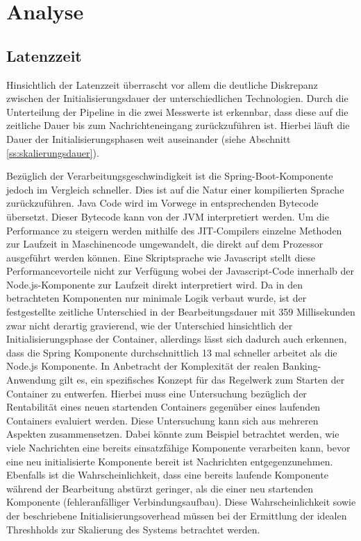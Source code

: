 \section{Analyse}


\subsection{Latenzzeit}
Hinsichtlich der Latenzzeit überrascht vor allem die deutliche Diskrepanz zwischen der Initialisierungsdauer der unterschiedlichen Technologien. Durch die Unterteilung der Pipeline in die zwei Messwerte ist erkennbar, dass diese auf die zeitliche Dauer bis zum Nachrichteneingang zurückzuführen ist. Hierbei läuft die Dauer der Initialisierungsphasen weit auseinander (siehe Abschnitt \ref{ss:skalierungsdauer}).

Bezüglich der Verarbeitungsgeschwindigkeit ist die Spring-Boot-Komponente jedoch im Vergleich schneller. Dies ist auf die Natur einer kompilierten Sprache zurückzuführen. Java Code wird im Vorwege in entsprechenden Bytecode übersetzt. Dieser Bytecode kann von der JVM interpretiert werden. Um die Performance zu steigern werden mithilfe des JIT-Compilers einzelne Methoden zur Laufzeit in Maschinencode umgewandelt, die direkt auf dem Prozessor ausgeführt werden können. Eine Skriptsprache wie Javascript stellt diese Performancevorteile nicht zur Verfügung wobei der Javascript-Code innerhalb der Node.js-Komponente zur Laufzeit direkt interpretiert wird. Da in den betrachteten Komponenten nur minimale Logik verbaut wurde, ist der festgestellte zeitliche Unterschied in der Bearbeitungsdauer mit 359  Millisekunden zwar nicht derartig gravierend, wie der Unterschied hinsichtlich der Initialisierungsphase der Container, allerdings lässt sich dadurch auch erkennen, dass die Spring Komponente durchschnittlich 13 mal schneller arbeitet als die Node.js Komponente. In Anbetracht der Komplexität der realen Banking-Anwendung gilt es, ein spezifisches Konzept für das Regelwerk zum Starten der Container zu entwerfen. Hierbei muss eine Untersuchung bezüglich der Rentabilität eines neuen startenden Containers gegenüber eines laufenden Containers evaluiert werden. Diese Untersuchung kann sich aus mehreren Aspekten zusammensetzen. Dabei könnte zum Beispiel betrachtet werden, wie viele Nachrichten eine bereits einsatzfähige Komponente verarbeiten kann, bevor eine neu initialisierte Komponente bereit ist Nachrichten entgegenzunehmen. Ebenfalls ist die Wahrscheinlichkeit, dass eine bereits laufende Komponente während der Bearbeitung abstürzt geringer, als die einer neu startenden Komponente (fehleranfälliger Verbindungsaufbau). Diese Wahrscheinlichkeit sowie der beschriebene Initialisierungsoverhead müssen bei der Ermittlung der idealen Threshholds zur Skalierung des Systems betrachtet werden.

